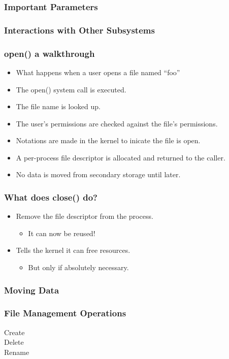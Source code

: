 \documentclass[pdftex]{beamer} %
\begin{document}
\begin{frame}
  \frametitle{Important Parameters}
  
\end{frame}

\begin{frame}
  \frametitle{Interactions with Other Subsystems}
  
\end{frame}

\begin{frame}
  \frametitle{open() a walkthrough}
  \begin{itemize}
  \item What happens when a user opens a file named ``foo''
  \item The open() system call is executed.
  \item The file name is looked up.
  \item The user's permissions are checked against the file's
    permissions.
  \item Notations are made in the kernel to inicate the file is open.
  \item A per-process file descriptor is allocated and returned to the
    caller.
  \item No data is moved from secondary storage until later.
  \end{itemize}
\end{frame}

\begin{frame}
  \frametitle{What does close() do?}
  \begin{itemize}
  \item Remove the file descriptor from the process.
    \begin{itemize}
    \item It can now be reused!
    \end{itemize}
  \item Tells the kernel it can free resources.
    \begin{itemize}
    \item But only if absolutely necessary.
    \end{itemize}
  \end{itemize}
\end{frame}

\begin{frame}
  \frametitle{Moving Data}
  
\end{frame}

\begin{frame}
  \frametitle{File Management Operations}
  \begin{description}
  \item[Create]
  \item[Delete]
  \item[Rename] 
  \end{description}
\end{frame}
\end{document}

